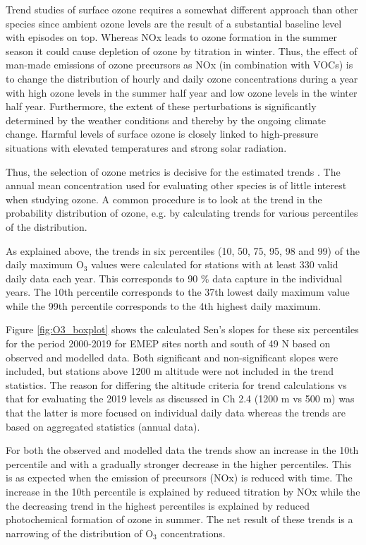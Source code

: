 Trend studies of surface ozone requires a somewhat different approach than other species since ambient ozone levels are the result of a substantial baseline level with episodes on top. Whereas NOx leads to ozone formation in the summer season it could cause depletion of ozone by titration in winter. Thus, the effect of man-made emissions of ozone precursors as NOx (in combination with VOCs) is to change the distribution of hourly and daily ozone concentrations during a year with high ozone levels in the summer half year and low ozone levels in the winter half year. Furthermore, the extent of these perturbations is significantly determined by the weather conditions and thereby by the ongoing climate change. Harmful levels of surface ozone is closely linked to high-pressure situations with elevated temperatures and strong solar radiation.

Thus, the selection of ozone metrics is decisive for the estimated trends \citep[e.g.][]{LefohnTOAR2018}. The annual mean concentration used for evaluating other species is of little interest when studying ozone. A common procedure is to look at the trend in the probability distribution of ozone, e.g. by calculating trends for various percentiles of the distribution.  

As explained above, the trends in six percentiles (10, 50, 75, 95, 98 and 99) of the daily maximum O$_3$ values were calculated for stations with at least 330 valid daily data each year. This corresponds to 90 \% data capture in the individual years. The 10th percentile corresponds to the 37th lowest daily maximum value while the 99th percentile corresponds to the 4th highest daily maximum. 

Figure \ref{fig:O3_boxplot} shows the calculated Sen's slopes for these six percentiles for the period 2000-2019 for EMEP sites north and south of 49 \degrees N based on observed and modelled data. Both significant and non-significant slopes were included, but stations above 1200 m altitude were not included in the trend statistics. The reason for differing the altitude criteria for trend calculations vs that for evaluating the 2019 levels as discussed in Ch 2.4 (1200 m vs 500 m) was that the latter is more focused on individual daily data whereas the trends are based on aggregated statistics (annual data). 

For both the observed and modelled data the trends show an increase in the 10th percentile and with a gradually stronger decrease in the higher percentiles. This is as expected when the emission of precursors (NOx) is reduced with time. The increase in the 10th percentile is explained by reduced titration by NOx while the the decreasing trend in the highest percentiles is explained by reduced photochemical formation of ozone in summer. The net result of these trends is a narrowing of the distribution of O$_3$ concentrations. 


